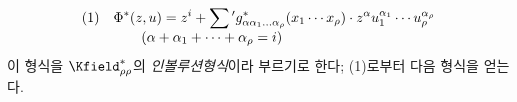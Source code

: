
\[
\begin{array}{@{}l@{\quad}l@{}}
(1)& \displaystyle \Phi^*(z,u)=z^i+\sum{}'g^*_{\alpha\alpha_1\ldots\alpha_\rho}(x_1\cdots x_\rho)\cdot
z^\alpha u_1^{\alpha_1}\cdots u_\rho^{\alpha_\rho}\\
& \displaystyle\qquad(\alpha+\alpha_1+\cdots+\alpha_\rho=i)
\end{array}
\]
이 형식을 $\Kfield^*_{\rho\rho}$의 \emph{인볼루션형식}이라 부르기로 한다; (1)로부터 다음 형식을 얻는다.
